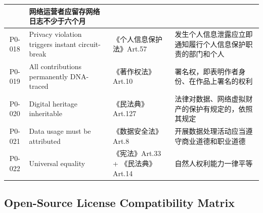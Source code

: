 \begin{table}[h]
\begin{tabular}{cllp{5.5cm}}
  & 网络运营者应留存网络日志不少于六个月 \\
\hline
P0-018 & Privacy violation triggers instant circuit-break & 《个人信息保护法》Art.57
  & 发生个人信息泄露应立即通知履行个人信息保护职责的部门和个人 \\
\hline
P0-019 & All contributions permanently DNA-traced & 《著作权法》Art.10
  & 署名权，即表明作者身份、在作品上署名的权利 \\
\hline
P0-020 & Digital heritage inheritable & 《民法典》Art.127
  & 法律对数据、网络虚拟财产的保护有规定的，依照其规定 \\
\hline
P0-021 & Data usage must be attributed & 《数据安全法》Art.8
  & 开展数据处理活动应当遵守商业道德和职业道德 \\
\hline
P0-022 & Universal equality & 《宪法》Art.33 + 《民法典》Art.14
  & 自然人权利能力一律平等 \\
\bottomrule
\end{tabular}
\end{table}

\subsection{Open-Source License Compatibility Matrix}

